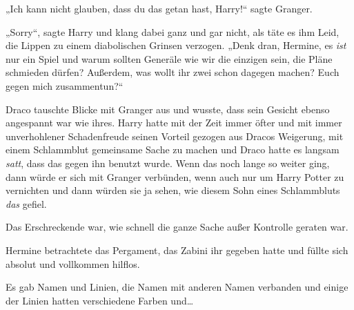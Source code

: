 „Ich kann nicht glauben, dass du das getan hast, Harry!“ sagte Granger.

„Sorry“, sagte Harry und klang dabei ganz und gar nicht, als täte es ihm Leid, die Lippen zu einem diabolischen Grinsen verzogen. „Denk dran, Hermine, es \emph{ist} nur ein Spiel und warum sollten Generäle wie wir die einzigen sein, die Pläne schmieden dürfen? Außerdem, was wollt ihr zwei schon dagegen machen? Euch gegen mich zusammentun?“

Draco tauschte Blicke mit Granger aus und wusste, dass sein Gesicht ebenso angespannt war wie ihres. Harry hatte mit der Zeit immer öfter und mit immer unverhohlener Schadenfreude seinen Vorteil gezogen aus Dracos Weigerung, mit einem Schlammblut gemeinsame Sache zu machen und Draco hatte es langsam \emph{satt}, dass das gegen ihn benutzt wurde. Wenn das noch lange so weiter ging, dann würde er sich mit Granger verbünden, wenn auch nur um Harry Potter zu vernichten und dann würden sie ja sehen, wie diesem Sohn eines Schlammbluts \emph{das} gefiel.

\later

Das Erschreckende war, wie schnell die ganze Sache außer Kontrolle geraten war.

Hermine betrachtete das Pergament, das Zabini ihr gegeben hatte und füllte sich absolut und vollkommen hilflos.

Es gab Namen und Linien, die Namen mit anderen Namen verbanden und einige der Linien hatten verschiedene Farben und…

